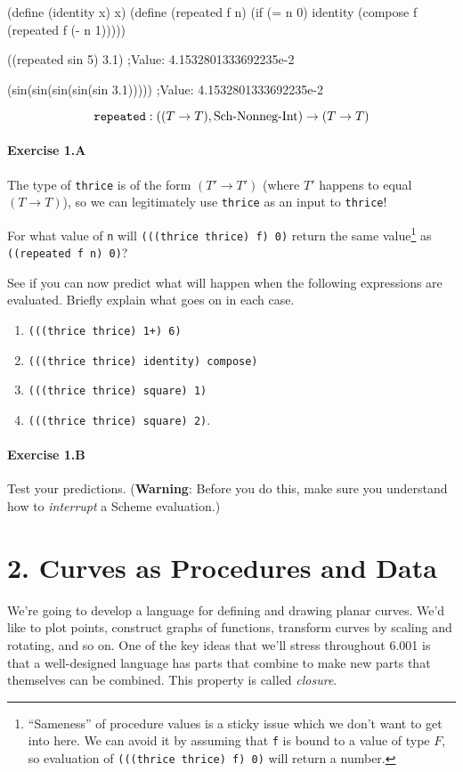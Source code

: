 \beginlisp
(define (identity x) x)
\null
(define (repeated f n)
  (if (= n 0)
      identity
      (compose f (repeated f (- n 1)))))

\null

((repeated sin 5) 3.1)
;Value: 4.1532801333692235e-2

\null

(sin(sin(sin(sin(sin 3.1)))))
;Value: 4.1532801333692235e-2
\endlisp

\[\hbox{\tt repeated} : ((T\rightarrow T),\mbox{Sch-Nonneg-Int}) \rightarrow (T\rightarrow T)\]

\paragraph{Exercise 1.A} The type of {\tt thrice} is of the form
$(T'\to T')$ (where $T'$ happens to equal $(T\to T)$), so we can
legitimately use {\tt thrice} as an input to {\tt thrice}!

For what value of {\tt n} will {\tt (((thrice thrice) f) 0)} return the
same value\footnote{``Sameness'' of procedure values is a sticky issue
which we don't want to get into here.  We can avoid it by assuming that
{\tt f} is bound to a value of type $F$, so evaluation of {\tt (((thrice
thrice) f) 0)} will return a number.} as {\tt ((repeated f n) 0)}?

See if you can now predict what will happen when the following expressions
are evaluated.  Briefly explain what goes on in each case.
\begin{enumerate}
\item {\tt (((thrice thrice) 1+) 6)}
\item {\tt (((thrice thrice) identity) compose)}
\item {\tt (((thrice thrice) square) 1)}
\item {\tt (((thrice thrice) square) 2)}.
\end{enumerate}

\paragraph{Exercise 1.B}  Test your predictions.  ({\bf Warning}:
Before you do this, make sure you understand how to {\em interrupt} a 
Scheme evaluation.)

\section{2. Curves as Procedures and Data}

We're going to develop a language for defining and drawing planar curves.
We'd like to plot points, construct graphs of functions, transform curves
by scaling and rotating, and so on.  One of the key ideas that we'll
stress throughout 6.001 is that a well-designed language has parts that
combine to make new parts that themselves can be combined.  This property
is called {\em closure}.

